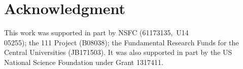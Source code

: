 \documentclass[10pt, conference, letterpaper]{IEEEtran}
\begin{document}

\section*{Acknowledgment}
This work was supported in part by NSFC (61173135,~U14\\05255);
the 111 Project (B08038); the Fundamental Research Funds for the Central Universities (JB171503).
It was also supported in part by the US National Science Foundation under Grant 1317411.






\end{document}
